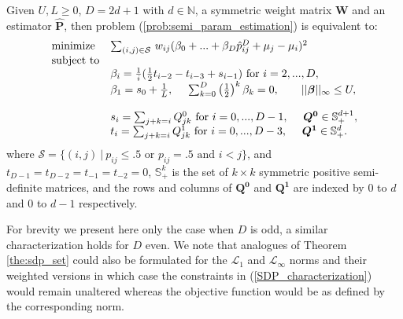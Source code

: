 \documentclass[twoside,11pt]{article}
\newcommand*{\Scale}[2][4]{\scalebox{#1}{$#2$}}%
\begin{document}
\begin{theorem}%
\label{the:sdp_set}
Given $U,L\geq 0$, $D = 2d+1$ with $d\in \mathbb{N}$, a symmetric weight matrix $\boldsymbol{W}$ and an estimator $\boldsymbol{\hat P}$, then problem (\ref{prob:semi_param_estimation}) is equivalent to:
\begin{equation}
\label{SDP_characterization}
\begin{array}{lllllllll}
\text{minimize}  & \Scale[1]{\sum}_{(i,j)\in \mathcal{S}} \ w_{ij}(\beta_0 +  ... + \beta_D\hat{p}_{ij}^D +\mu_j- \mu_i )^2  \\
\text{subject to} \\
  &  \beta_{i} =  \frac{1}{i}(\frac{1}{2}t_{i-2} - t_{i-3} + s_{i-1})   \Scale[1]{\text{ for } i = 2,...,D},\\
  & \beta_{1}   = s_{0} +\frac{1}{L}, \ \ \ \ \sum_{k = 0}^D \left(\frac{1}{2}\right)^k \beta_k  = 0, \ \ \ \ \ \ ||\boldsymbol{\beta}||_{\infty} \leq U, \\

&   \\

& s_i =  \sum_{j+k = i}Q^0_{jk}   \Scale[1]{\text{ for } i = 0,...,D-1},  \ \ \ \  \boldsymbol{Q^0} \in \mathbb{S}_+^{d+1},\\
& t_i =  \sum_{j+k = i}Q^1_{jk}   \Scale[1]{\text{ for } i = 0,...,D-3},  \ \ \ \  \boldsymbol{Q^1} \in \mathbb{S}_+^{d}. \\
\end{array}
\end{equation}
where $\mathcal{S} = \{(i,j) \  | \ p_{ij} \leq .5 \text{ or } p_{ij} = .5 \text{ and } i<j\}$,  and  $t_{D-1}=t_{D-2}=t_{-1}=t_{-2}=0$, $\mathbb{S}_+^{k}$ is the set of $k\times k$ symmetric positive semi-definite matrices, and the rows and columns of $\boldsymbol{Q^0}$ and $\boldsymbol{Q^1}$ are indexed by $0$ to $d$ and $0$ to $d-1$ respectively. 
\end{theorem}

For brevity we present here only the case when $D$ is odd, a similar characterization holds for $D$ even. We note that analogues of Theorem \ref{the:sdp_set} could also be formulated for the  $\mathcal{L}_1$ and $\mathcal{L}_{\infty}$ norms and their weighted versions in which case the constraints in (\ref{SDP_characterization}) would remain unaltered whereas the objective function would be as defined by the corresponding norm.
\end{document}
